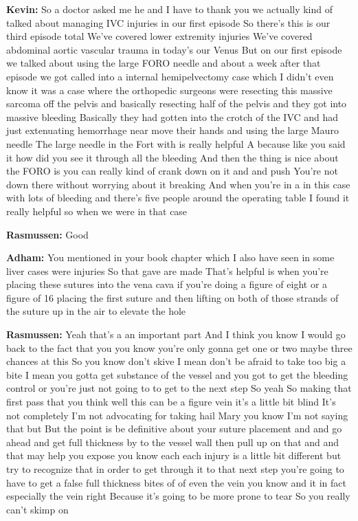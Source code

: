 \documentclass[
]{book}
\begin{document}
\textbf{Kevin:} So a doctor asked me he and I have to thank you we actually kind of talked about managing IVC injuries in our first episode So there's this is our third episode total We've covered lower extremity injuries We've covered abdominal aortic vascular trauma in today's our Venus But on our first episode we talked about using the large FORO needle and about a week after that episode we got called into a internal hemipelvectomy case which I didn't even know it was a case where the orthopedic surgeons were resecting this massive sarcoma off the pelvis and basically resecting half of the pelvis and they got into massive bleeding Basically they had gotten into the crotch of the IVC and had just extenuating hemorrhage near move their hands and using the large Mauro needle The large needle in the Fort with is really helpful A because like you said it how did you see it through all the bleeding And then the thing is nice about the FORO is you can really kind of crank down on it and and push You're not down there without worrying about it breaking And when you're in a in this case with lots of bleeding and there's five people around the operating table I found it really helpful so when we were in that case

\textbf{Rasmussen:} Good

\textbf{Adham:} You mentioned in your book chapter which I also have seen in some liver cases were injuries So that gave are made That's helpful is when you're placing these sutures into the vena cava if you're doing a figure of eight or a figure of 16 placing the first suture and then lifting on both of those strands of the suture up in the air to elevate the hole

\textbf{Rasmussen:} Yeah that's a an important part And I think you know I would go back to the fact that you you know you're only gonna get one or two maybe three chances at this So you know don't skive I mean don't be afraid to take too big a bite I mean you gotta get substance of the vessel and you got to get the bleeding control or you're just not going to to get to the next step So yeah So making that first pass that you think well this can be a figure vein it's a little bit blind It's not completely I'm not advocating for taking hail Mary you know I'm not saying that but But the point is be definitive about your suture placement and and go ahead and get full thickness by to the vessel wall then pull up on that and and that may help you expose you know each each injury is a little bit different but try to recognize that in order to get through it to that next step you're going to have to get a false full thickness bites of of even the vein you know and it in fact especially the vein right Because it's going to be more prone to tear So you really can't skimp on
\end{document}
